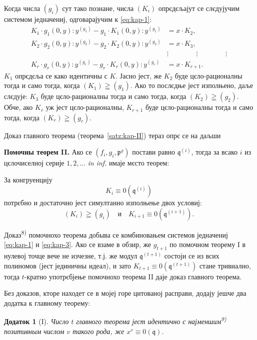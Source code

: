 \documentclass[11pt]{article}
\theoremstyle{plain}
\newtheorem{zusatz}{Додаток}
\begin{document}
Когда числа $(g_{i})$ сут тако познане, числа $(K_{i})$ опрєдєљајут
се слєдујучим системом једначениј, одговарајучим к \eqref{eq:kap-1}:
\begin{equation}\label{eq:kap-3}
\begin{aligned}
K_{1}\cdot g_{1}(0,y):y^{(g_{1})} - g_{1}\cdot K_{1}(0,y):y^{(g_{1})} &= x\cdot K_{2},\\
K_{2}\cdot g_{2}(0,y):y^{(g_{2})} - g_{2}\cdot K_{2}(0,y):y^{(g_{2})} &= x\cdot K_{3},\\
&\vdots \qquad\qquad\vdots\qquad\qquad\vdots\\
K_{r}\cdot g_{r}(0,y):y^{(g_{r})} - g_{r}\cdot K_{r}(0,y):y^{(g_{r})} &= x\cdot K_{r+1}.
\end{aligned}
\end{equation}
$K_{1}$ опрєдєља се како идентичны с $K$. Јасно јест, же $K_{2}$
буде цєло-рационалны тогда и само тогда, когда
$(K_1)\geqq(g_1)$. Ако то послєдње јест изполњено, даље
слєдује: $K_{3}$ буде цєло-рационалны тогда и само тогда, когда
$(K_2)\geqq(g_2)$. Обче, ако $K_{r}$ уж јест цєло-рационалны,
$K_{r+1}$ буде цєло-рационалны тогда и само тогда, когда
$(K_r)\geqq(g_r)$.

Доказ главного теорема (теорема~\ref{satz:kap-II}) тераз опрє се на
даљши

\smallskip
\textbf{Помочны теорем II.} Ако се
$(f_i,g_i,\mathfrak{p}^\varrho)$ постави равно
$\mathfrak{q}^{(i)}$, тогда за всако $i$ из цєлочиселној серије
$1, 2, \ldots$ \textit{in inf.} имаје мєсто теорем:

За конгруенцију
\[
K_{i} \equiv 0(\mathfrak{q}^{(i)})
\]
потрєбно и достаточно јест симултанно изполњење двох условиј:
\[
(K_i)\geqq(g_i)\quad \text{и}\quad K_{i+1}\equiv0(\mathfrak{q}^{(i+1)}).
\]

Доказ\textsuperscript{8)} помочнохо теорема добыва се комбиновањем
системов једначениј \eqref{eq:kap-1} и \eqref{eq:kap-3}. Ако се
взаме в обзир, же $g_{t+1}$ по помочном теорему I в нулевој точце вече не
изчезне, т.ј. же модул $\mathfrak{q}^{(t+1)}$ состоји се из всих
полиномов (јест јединичны идеал), и зато
$K_{t+1} \equiv 0(\mathfrak{q}^{(t+1)})$ стане тривиално, тогда
$t$-кратно употрєбјење помочнохо теорема II даје доказ главного
теорема.

\smallskip
Без доказов, кторе находет се в мојеј горе цитованој расправи,
додају јешче два додатка к главному теорему:

\begin{zusatz}[I]
Число $t$ главного теорема јест идентично с најменшим\textsuperscript{9)}
позитивным числом $v$ такого рода, же
$x^{v} \equiv 0(\mathfrak{q})$.
\end{zusatz}
\end{document}
